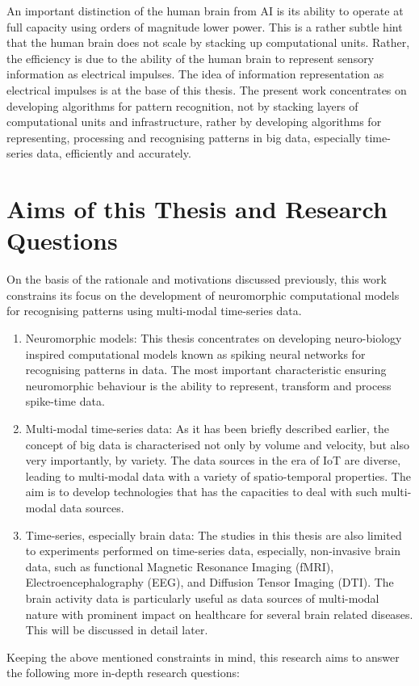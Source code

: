 An important distinction of the human brain from AI is its ability to operate at full capacity using orders of magnitude lower power. This is a rather subtle hint that the human brain does not scale by stacking up computational units. Rather, the efficiency is due to the ability of the human brain to represent sensory information as electrical impulses. The idea of information representation as electrical impulses is at the base of this thesis. The present work concentrates on developing algorithms for pattern recognition, not by stacking layers of computational units and infrastructure, rather by developing algorithms for representing, processing and recognising patterns in big data, especially time-series data, efficiently and accurately.     


\section{Aims of this Thesis and Research Questions}
\label{sec:research_ques}
On the basis of the rationale and motivations discussed previously, this work constrains its focus on the development of neuromorphic computational models for recognising patterns using multi-modal time-series data.

\begin{enumerate}
	\item Neuromorphic models: This thesis concentrates on developing neuro-biology inspired computational models known as spiking neural networks for recognising patterns in data. The most important characteristic ensuring neuromorphic behaviour is the ability to represent, transform and process spike-time data. 
	\item  Multi-modal time-series data: As it has been briefly described earlier, the concept of big data is characterised not only by volume and velocity, but also very importantly, by variety. The data sources in the era of IoT are diverse, leading to multi-modal data with a variety of spatio-temporal properties. The aim is to develop technologies that has the capacities to deal with such multi-modal data sources.
	\item Time-series, especially brain data: The studies in this thesis are also limited to experiments performed on time-series data, especially, non-invasive brain data, such as functional Magnetic Resonance Imaging (fMRI), Electroencephalography (EEG), and Diffusion Tensor Imaging (DTI). The brain activity data is particularly useful as data sources of multi-modal nature with prominent impact on healthcare for several brain related diseases. This will be discussed in detail later.   
\end{enumerate} 
Keeping the above mentioned constraints in mind, this research aims to answer the following more in-depth research questions:

